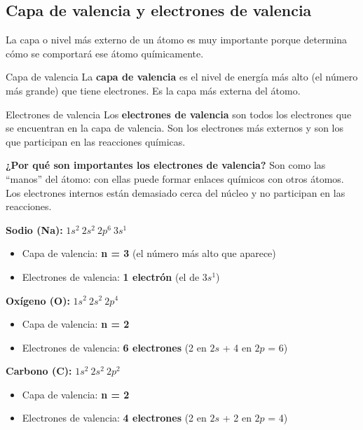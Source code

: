 \subsection{Capa de valencia y electrones de valencia}
La capa o nivel más externo de un átomo es muy importante porque determina cómo se comportará ese átomo químicamente.
\begin{definition}{Capa de valencia}
    La \textbf{capa de valencia} es el nivel de energía más alto (el número más grande) que tiene electrones. Es la capa más externa del átomo.
\end{definition}
\begin{definition}{Electrones de valencia}
    Los \textbf{electrones de valencia} son todos los electrones que se encuentran en la capa de valencia. Son los electrones más externos y son los que participan en las reacciones químicas.
\end{definition}
\begin{remark}
    \textbf{¿Por qué son importantes los electrones de valencia?} Son como las ``manos'' del átomo: con ellas puede formar enlaces químicos con otros átomos. Los electrones internos están demasiado cerca del núcleo y no participan en las reacciones.
\end{remark}
\begin{example}
    \textbf{Sodio (Na):} \( 1s^2\ 2s^2\ 2p^6\ 3s^1 \)
    \begin{itemize}
        \item Capa de valencia: \textbf{n = 3} (el número más alto que aparece)
        \item Electrones de valencia: \textbf{1 electrón} (el de \( 3s^1 \))
    \end{itemize}

    \textbf{Oxígeno (O):} \( 1s^2\ 2s^2\ 2p^4 \)
    \begin{itemize}
        \item Capa de valencia: \textbf{n = 2}
        \item Electrones de valencia: \textbf{6 electrones} (2 en \( 2s \) + 4 en \( 2p \) = 6)
    \end{itemize}

    \textbf{Carbono (C):} \( 1s^2\ 2s^2\ 2p^2 \)
    \begin{itemize}
        \item Capa de valencia: \textbf{n = 2}
        \item Electrones de valencia: \textbf{4 electrones} (2 en \( 2s \) + 2 en \( 2p \) = 4)
    \end{itemize}
\end{example}
